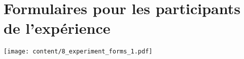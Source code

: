 \chapter{Formulaires pour les participants de l'expérience}
\label{annex:experiment_forms}

\texttt{[image: content/8\_experiment\_forms\_1.pdf]}



